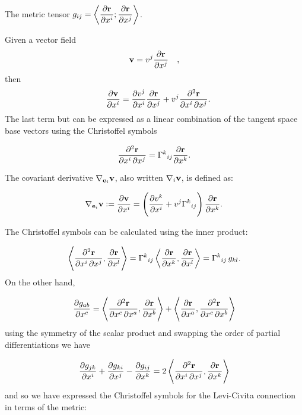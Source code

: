 The metric tensor
\(g_{ij} = \left\langle \dfrac{\partial\mathbf{ r}}{\partial x^i} ; \dfrac{\partial\mathbf{ r}}{\partial x^j} \right\rangle\).


Given a vector field 
\[\mathbf{ v} = v^j \dfrac{\partial \mathbf{ r}}{\partial x^j}\quad,\] then
\[\quad\dfrac{\partial\mathbf{ v}}{\partial x^i} = \dfrac{\partial v^j}{\partial x^i}  \dfrac{\partial \mathbf{ r}}{\partial x^j}  +  v^j \dfrac{\partial^2 \mathbf{ r}}{\partial x^i \, \partial x^j}.\]
The last term but can be expressed as a
linear combination of the tangent space base vectors using the
Christoffel symbols 

\[\dfrac{\partial^2 \mathbf{ r}}{\partial x^i \, \partial x^j}  = \Gamma^k{}_{ij} \dfrac{\partial\mathbf{ r}}{\partial x^k} 
.\]

\begin{df}
 The covariant derivative \(\nabla_{{\mathbf{ e}}_i} \mathbf{ v}\), also written
\(\nabla_i \mathbf{ v}\), is defined as:

\[\nabla_{{\mathbf{ e}}_i} \mathbf{ v} := \dfrac{\partial\mathbf{ v}}{\partial x^i} = \left( \dfrac{\partial v^k}{\partial x^i} + v^j \Gamma^k{}_{ij} \right) \dfrac{\partial\mathbf{ r}}{\partial x^k}.\]
\end{df}



The Christoffel symbols can be calculated using the inner product:

\[\left\langle  \dfrac{\partial^2 \mathbf{ r}}{\partial x^i \, \partial x^j} , \dfrac{\partial\mathbf{ r}}{\partial x^l} \right\rangle = \Gamma^k{}_{ij}  \left\langle \dfrac{\partial\mathbf{ r}}{\partial x^k} , \dfrac{\partial\mathbf{ r}}{\partial x^l} \right\rangle =  \Gamma^k{}_{ij} \, g_{kl}.\]
On the other hand,

\[\dfrac{\partial g_{ab}}{\partial x^c} = \left\langle \dfrac{\partial^2 \mathbf{ r}}{ \partial x^c \, \partial x^a} , \dfrac{\partial \mathbf{ r}}{\partial x^b} \right\rangle +  \left\langle \dfrac{\partial \mathbf{ r}}{\partial x^a} , \dfrac{\partial^2 \mathbf{ r}}{ \partial x^c \, \partial x^b} \right\rangle\]
using the symmetry of the scalar product and swapping the order
of partial differentiations we have

\[\dfrac{\partial g_{jk}}{\partial x^i} + \dfrac{\partial g_{ki}}{\partial x^j} - \dfrac{\partial g_{ij}}{\partial x^k} = 2\left\langle  \dfrac{\partial^2 \mathbf{ r}}{\partial x^i \, \partial x^j} , \dfrac{\partial\mathbf{ r}}{\partial x^k} \right\rangle\]
and so we have expressed the Christoffel symbols for the Levi-Civita connection in
terms of the metric:

